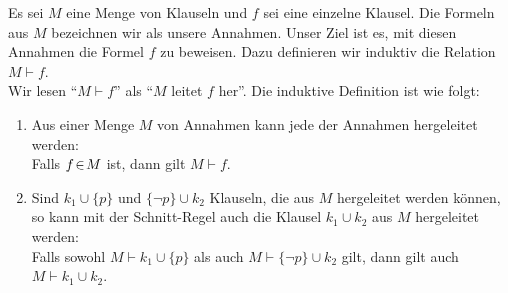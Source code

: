 \begin{Definition}[$\vdash$]
    Es sei $M$ eine Menge von Klauseln  und $f$ sei eine einzelne Klausel.  
    Die Formeln aus $M$ bezeichnen wir als unsere Annahmen.  Unser Ziel ist es, mit diesen
    Annahmen die Formel $f$ zu beweisen.  Dazu definieren wir induktiv die Relation \\[0.2cm]
    \hspace*{1.3cm} $M \vdash f$. \\[0.2cm]
    Wir lesen ``$M \vdash f$'' als ``$M$ leitet $f$ her''.  Die induktive Definition ist
    wie folgt:
    \begin{enumerate}
    \item Aus einer Menge $M$ von Annahmen kann jede der Annahmen hergeleitet werden: \\[0.2cm]
          \hspace*{1.3cm} 
          Falls $f \!\in\! M$ ist, dann gilt  $M \vdash f$.
    \item Sind $k_1 \cup \{p\}$ und $\{ \neg p \} \cup k_2$ Klauseln, die aus $M$
          hergeleitet werden k\"{o}nnen, so kann mit der Schnitt-Regel auch die Klausel $k_1 \cup k_2$ aus $M$
          hergeleitet werden: \\[0.2cm]
          \hspace*{1.3cm} 
          Falls sowohl $M \vdash k_1 \cup \{p\}$ als auch $M \vdash \{ \neg p \} \cup k_2$
          gilt, dann gilt auch $M \vdash k_1 \cup k_2$.
    \eox
    \end{enumerate}
\end{Definition}



